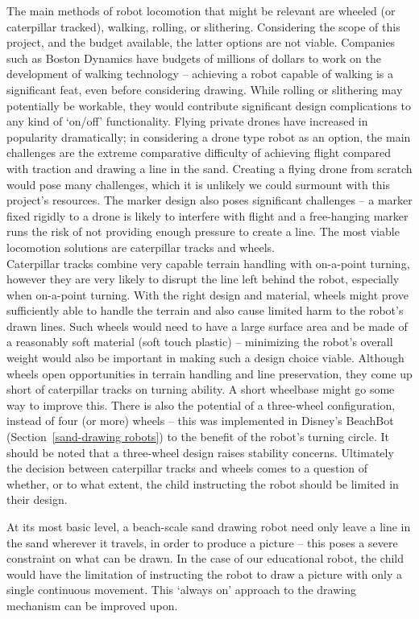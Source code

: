     The main methods of robot locomotion that might be relevant are wheeled (or caterpillar tracked), walking, rolling, or slithering. Considering the scope of this project, and the budget available, the latter options are not viable. Companies such as Boston Dynamics have budgets of millions of dollars to work on the development of walking technology -- achieving a robot capable of walking is a significant feat, even before considering drawing. While rolling or slithering may potentially be workable, they would contribute significant design complications to any kind of `on/off' functionality. Flying private drones have increased in popularity dramatically; in considering a drone type robot as an option, the main challenges are the extreme comparative difficulty of achieving flight compared with traction and drawing a line in the sand. Creating a flying drone from scratch would pose many challenges, which it is unlikely we could surmount with this project's resources. The marker design also poses significant challenges -- a marker fixed rigidly to a drone is likely to interfere with flight and a free-hanging marker runs the risk of not providing enough pressure to create a line. The most viable locomotion solutions are caterpillar tracks and wheels.\\
    Caterpillar tracks combine very capable terrain handling with on-a-point turning, however they are very likely to disrupt the line left behind the robot, especially when on-a-point turning.  With the right design and material, wheels might prove sufficiently able to handle the terrain and also cause limited harm to the robot's drawn lines. Such wheels would need to have a large surface area and be made of a reasonably soft material (\eg soft touch plastic) -- minimizing the robot's overall weight would also be important in making such a design choice viable. Although wheels open opportunities in terrain handling and line preservation, they come up short of caterpillar tracks on turning ability. A short wheelbase might go some way to improve this. There is also the potential of a three-wheel configuration, instead of four (or more) wheels -- this was implemented in Disney's BeachBot (Section~\ref{sand-drawing robots}) to the benefit of the robot’s turning circle. It should be noted that a three-wheel design raises stability concerns. Ultimately the decision between caterpillar tracks and wheels comes to a question of whether, or to what extent, the child instructing the robot should be limited in their design.

    At its most basic level, a beach-scale sand drawing robot need only leave a line in the sand wherever it travels, in order to produce a picture -- this poses a severe constraint on what can be drawn. In the case of our educational robot, the child would have the limitation of instructing the robot to draw a picture with only a single continuous movement. This `always on' approach to the drawing mechanism can be improved upon.

